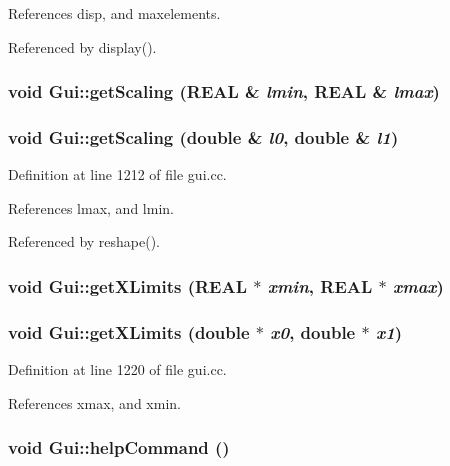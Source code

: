 References disp, and maxelements.

Referenced by display().\hypertarget{namespaceGui_ecc4bc7e909d123787c57982a5059d37}{
\subsubsection[{getScaling}]{\setlength{\rightskip}{0pt plus 5cm}void Gui::getScaling (REAL \& {\em lmin}, \/  REAL \& {\em lmax})}}
\label{namespaceGui_ecc4bc7e909d123787c57982a5059d37}


\hypertarget{namespaceGui_e7d03455e3e501e3e58965a138c3aa6c}{
\subsubsection[{getScaling}]{\setlength{\rightskip}{0pt plus 5cm}void Gui::getScaling (double \& {\em l0}, \/  double \& {\em l1})}}
\label{namespaceGui_e7d03455e3e501e3e58965a138c3aa6c}




Definition at line 1212 of file gui.cc.

References lmax, and lmin.

Referenced by reshape().\hypertarget{namespaceGui_6303d84a2defe353bcdde5e2d64c54fc}{
\subsubsection[{getXLimits}]{\setlength{\rightskip}{0pt plus 5cm}void Gui::getXLimits (REAL $\ast$ {\em xmin}, \/  REAL $\ast$ {\em xmax})}}
\label{namespaceGui_6303d84a2defe353bcdde5e2d64c54fc}


\hypertarget{namespaceGui_ea3e30468c8a97723f3a69e8810b4b38}{
\subsubsection[{getXLimits}]{\setlength{\rightskip}{0pt plus 5cm}void Gui::getXLimits (double $\ast$ {\em x0}, \/  double $\ast$ {\em x1})}}
\label{namespaceGui_ea3e30468c8a97723f3a69e8810b4b38}




Definition at line 1220 of file gui.cc.

References xmax, and xmin.\hypertarget{namespaceGui_88a5c559d5b4309bd2c3d1ff11f93692}{
\subsubsection[{helpCommand}]{\setlength{\rightskip}{0pt plus 5cm}void Gui::helpCommand ()}}
\label{namespaceGui_88a5c559d5b4309bd2c3d1ff11f93692}




